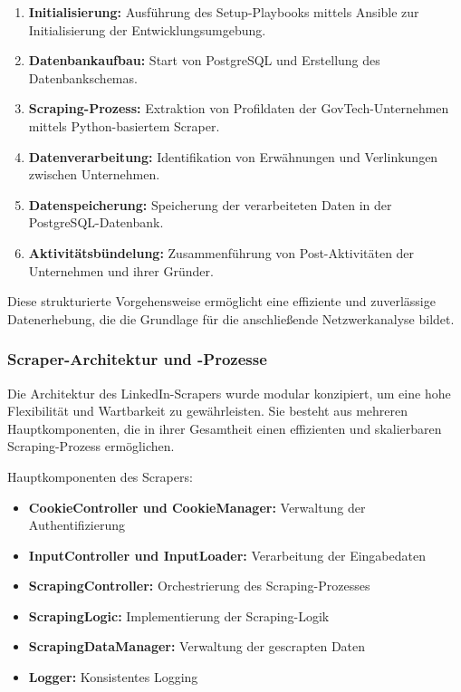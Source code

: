 \documentclass[a4paper,11pt]{article}
\begin{document}
\begin{enumerate}
    \item \textbf{Initialisierung:} Ausführung des Setup-Playbooks mittels Ansible zur Initialisierung der Entwicklungsumgebung.
    \item \textbf{Datenbankaufbau:} Start von PostgreSQL und Erstellung des Datenbankschemas.
    \item \textbf{Scraping-Prozess:} Extraktion von Profildaten der GovTech-Unternehmen mittels Python-basiertem Scraper.
    \item \textbf{Datenverarbeitung:} Identifikation von Erwähnungen und Verlinkungen zwischen Unternehmen.
    \item \textbf{Datenspeicherung:} Speicherung der verarbeiteten Daten in der PostgreSQL-Datenbank.
    \item \textbf{Aktivitätsbündelung:} Zusammenführung von Post-Aktivitäten der Unternehmen und ihrer Gründer.
\end{enumerate}

Diese strukturierte Vorgehensweise ermöglicht eine effiziente und zuverlässige Datenerhebung, die die Grundlage für die anschließende Netzwerkanalyse bildet.

\subsubsection{Scraper-Architektur und -Prozesse}

Die Architektur des LinkedIn-Scrapers wurde modular konzipiert, um eine hohe Flexibilität und Wartbarkeit zu gewährleisten. Sie besteht aus mehreren Hauptkomponenten, die in ihrer Gesamtheit einen effizienten und skalierbaren Scraping-Prozess ermöglichen.

Hauptkomponenten des Scrapers:

\begin{itemize}
    \item \textbf{CookieController und CookieManager:} Verwaltung der Authentifizierung
    \item \textbf{InputController und InputLoader:} Verarbeitung der Eingabedaten
    \item \textbf{ScrapingController:} Orchestrierung des Scraping-Prozesses
    \item \textbf{ScrapingLogic:} Implementierung der Scraping-Logik
    \item \textbf{ScrapingDataManager:} Verwaltung der gescrapten Daten
    \item \textbf{Logger:} Konsistentes Logging
\end{itemize}
\end{document}
